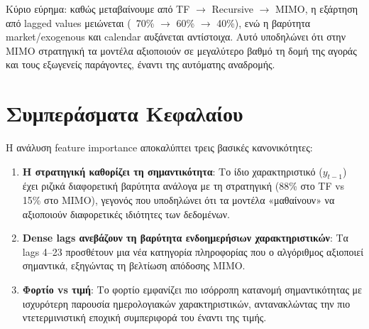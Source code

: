Κύριο εύρημα: καθώς μεταβαίνουμε από TF $\to$ Recursive $\to$ MIMO, η εξάρτηση από
lagged values μειώνεται (~70\% $\to$ 60\% $\to$ 40\%), ενώ η βαρύτητα market/exogenous
και calendar αυξάνεται αντίστοιχα. Αυτό υποδηλώνει ότι στην MIMO στρατηγική τα
μοντέλα αξιοποιούν σε μεγαλύτερο βαθμό τη δομή της αγοράς και τους εξωγενείς
παράγοντες, έναντι της αυτόματης αναδρομής.

\section{Συμπεράσματα Κεφαλαίου}
\label{sec:fi_conclusions}

Η ανάλυση feature importance αποκαλύπτει τρεις βασικές κανονικότητες:

\begin{enumerate}
    \item \textbf{Η στρατηγική καθορίζει τη σημαντικότητα}: Το ίδιο χαρακτηριστικό
    ($y_{t-1}$) έχει ριζικά διαφορετική βαρύτητα ανάλογα με τη στρατηγική (88\%
    στο TF vs 15\% στο MIMO), γεγονός που υποδηλώνει ότι τα μοντέλα «μαθαίνουν»
    να αξιοποιούν διαφορετικές ιδιότητες των δεδομένων.

    \item \textbf{Dense lags ανεβάζουν τη βαρύτητα ενδοημερήσιων χαρακτηριστικών}:
    Τα lags 4--23 προσθέτουν μια νέα κατηγορία πληροφορίας που ο αλγόριθμος
    αξιοποιεί σημαντικά, εξηγώντας τη βελτίωση απόδοσης MIMO.

    \item \textbf{Φορτίο vs τιμή}: Το φορτίο εμφανίζει πιο ισόρροπη κατανομή
    σημαντικότητας με ισχυρότερη παρουσία ημερολογιακών χαρακτηριστικών, αντανακλώντας
    την πιο ντετερμινιστική εποχική συμπεριφορά του έναντι της τιμής.
\end{enumerate}
